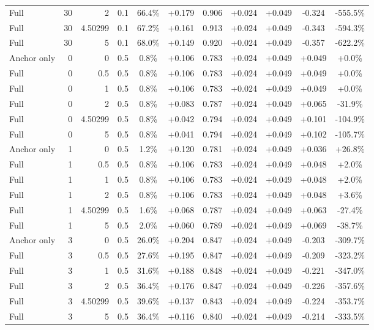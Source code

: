 \begin{table}[htbp]
\begin{tabular}{lrrrccccccc}
Full & 30 & 2 & 0.1 & 66.4\% & +0.179 & 0.906 & +0.024 & +0.049 & -0.324 & -555.5\% \\
Full & 30 & 4.50299 & 0.1 & 67.2\% & +0.161 & 0.913 & +0.024 & +0.049 & -0.343 & -594.3\% \\
Full & 30 & 5 & 0.1 & 68.0\% & +0.149 & 0.920 & +0.024 & +0.049 & -0.357 & -622.2\% \\
Anchor only & 0 & 0 & 0.5 & 0.8\% & +0.106 & 0.783 & +0.024 & +0.049 & +0.049 & +0.0\% \\
Full & 0 & 0.5 & 0.5 & 0.8\% & +0.106 & 0.783 & +0.024 & +0.049 & +0.049 & +0.0\% \\
Full & 0 & 1 & 0.5 & 0.8\% & +0.106 & 0.783 & +0.024 & +0.049 & +0.049 & +0.0\% \\
Full & 0 & 2 & 0.5 & 0.8\% & +0.083 & 0.787 & +0.024 & +0.049 & +0.065 & -31.9\% \\
Full & 0 & 4.50299 & 0.5 & 0.8\% & +0.042 & 0.794 & +0.024 & +0.049 & +0.101 & -104.9\% \\
Full & 0 & 5 & 0.5 & 0.8\% & +0.041 & 0.794 & +0.024 & +0.049 & +0.102 & -105.7\% \\
Anchor only & 1 & 0 & 0.5 & 1.2\% & +0.120 & 0.781 & +0.024 & +0.049 & +0.036 & +26.8\% \\
Full & 1 & 0.5 & 0.5 & 0.8\% & +0.106 & 0.783 & +0.024 & +0.049 & +0.048 & +2.0\% \\
Full & 1 & 1 & 0.5 & 0.8\% & +0.106 & 0.783 & +0.024 & +0.049 & +0.048 & +2.0\% \\
Full & 1 & 2 & 0.5 & 0.8\% & +0.106 & 0.783 & +0.024 & +0.049 & +0.048 & +3.6\% \\
Full & 1 & 4.50299 & 0.5 & 1.6\% & +0.068 & 0.787 & +0.024 & +0.049 & +0.063 & -27.4\% \\
Full & 1 & 5 & 0.5 & 2.0\% & +0.060 & 0.789 & +0.024 & +0.049 & +0.069 & -38.7\% \\
Anchor only & 3 & 0 & 0.5 & 26.0\% & +0.204 & 0.847 & +0.024 & +0.049 & -0.203 & -309.7\% \\
Full & 3 & 0.5 & 0.5 & 27.6\% & +0.195 & 0.847 & +0.024 & +0.049 & -0.209 & -323.2\% \\
Full & 3 & 1 & 0.5 & 31.6\% & +0.188 & 0.848 & +0.024 & +0.049 & -0.221 & -347.0\% \\
Full & 3 & 2 & 0.5 & 36.4\% & +0.176 & 0.847 & +0.024 & +0.049 & -0.226 & -357.6\% \\
Full & 3 & 4.50299 & 0.5 & 39.6\% & +0.137 & 0.843 & +0.024 & +0.049 & -0.224 & -353.7\% \\
Full & 3 & 5 & 0.5 & 36.4\% & +0.116 & 0.840 & +0.024 & +0.049 & -0.214 & -333.5\% \\

\end{tabular}
\end{table}
